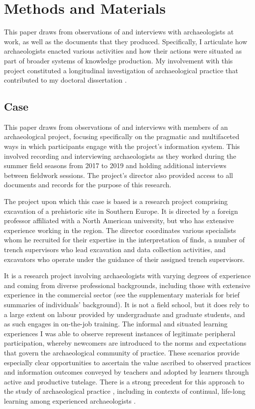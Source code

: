 \documentclass[
]{article}
\author{}
\date{}
\begin{document}
\section{Methods and Materials}\label{methods-and-materials}

This paper draws from observations of and interviews with archaeologists
at work, as well as the documents that they produced. Specifically, I
articulate how archaeologists enacted various activities and how their
actions were situated as part of broader systems of knowledge
production. My involvement with this project constituted a longitudinal
investigation of archaeological practice that contributed to my doctoral
dissertation \autocite[see][]{batist2023a}.

\subsection{Case}\label{case}

This paper draws from observations of and interviews with members of an
archaeological project, focusing specifically on the pragmatic and
multifaceted ways in which participants engage with the project's
information system. This involved recording and interviewing
archaeologists as they worked during the summer field seasons from 2017
to 2019 and holding additional interviews between fieldwork sessions.
The project's director also provided access to all documents and records
for the purpose of this research.

The project upon which this case is based is a research project
comprising excavation of a prehistoric site in Southern Europe. It is
directed by a foreign professor affiliated with a North American
university, but who has extensive experience working in the region. The
director coordinates various specialists whom he recruited for their
expertise in the interpretation of finds, a number of trench supervisors
who lead excavation and data collection activities, and excavators who
operate under the guidance of their assigned trench supervisors.

It is a research project involving archaeologists with varying degrees
of experience and coming from diverse professional backgrounds,
including those with extensive experience in the commercial sector (see
the supplementary materials for brief summaries of individuals'
background). It is not a field school, but it does rely to a large
extent on labour provided by undergraduate and graduate students, and as
such engages in on-the-job training. The informal and situated learning
experiences I was able to observe represent instances of legitimate
peripheral participation, whereby newcomers are introduced to the norms
and expectations that govern the archaeological community of practice.
These scenarios provide especially clear opportunities to ascertain the
value ascribed to observed practices and information outcomes conveyed
by teachers and adopted by learners through active and productive
tutelage. There is a strong precedent for this approach to the study of
archaeological practice
\autocites[cf.][]{everill2007,goodwin1994,goodwin2010,morgan2018},
including in contexts of continual, life-long learning among experienced
archaeologists \autocites[cf.][]{edgeworth1991,gero1994,graham2019}.
\end{document}
